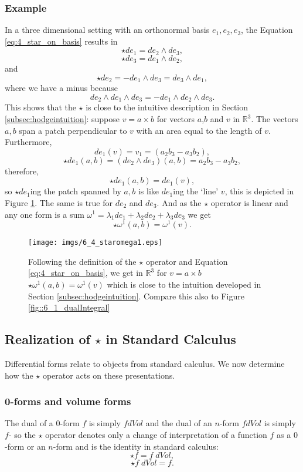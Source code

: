 \subsubsection{Example}
In a three dimensional setting with an orthonormal basis $e_1, e_2, e_3$, the Equation \ref{eq:4_star_on_basis} results in
\[\star de_1 =  de_2 \wedge de_3,\]
\[\star de_3 =  de_1 \wedge de_2,\]
and 
\[\star de_2 =  - de_1 \wedge de_3 =  de_3 \wedge de_1,\]
where we have a minus because
\[de_2 \wedge de_1 \wedge de_3 = - de_1 \wedge de_2 \wedge de_3.\]
This shows that the $\star$ is close to the intuitive description in Section \ref{subsec:hodgeintuition}:  suppose $v = a \times b$ for vectors $a$,$b$ and $v$ in $\mathbb R^3$. The vectors $a,b$ span a patch perpendicular to $v$ with an area equal to the length of $v$. Furthermore, 
\[de_1(v) = v_1 = (a_2b_3 -a_3b_2),\] 
\[\star de_1 (a,b)= (de_2 \wedge de_3)(a,b) = a_2b_3 -a_3b_2, \]
therefore,
\[\star de_1 (a,b) = de_1(v),\]
so $\star de_1$ing the patch spanned by $a,b$ is like $de_1$ing the `line' $v$, this is depicted in Figure \ref{fig:4_star_formal}. The same is true for $de_2$ and $de_3$. And as the $\star$ operator is linear and any one form is a sum $\omega^1 = \lambda_1de_1 + \lambda_2de_2 + \lambda_3de_3$ we get
\[\star\omega^1(a,b) = \omega^1(v).\]

\begin{figure}%
\begin{center}
\texttt{[image: imgs/6\_4\_staromega1.eps]}
\end{center}
\caption{Following the definition of the $\star$ operator and  Equation \ref{eq:4_star_on_basis}, we get in $\mathbb R^3$ for $v = a \times b$ $\star\omega^1(a,b) = \omega^1(v)$ which is close to the intuition developed in Section \ref{subsec:hodgeintuition}. Compare this also to Figure \ref{fig::6_1_dualIntegral}}
\label{fig:4_star_formal}%
\end{figure}


\subsection{Realization of $\star$ in Standard Calculus}
Differential forms relate to objects from standard calculus. We now determine how the $\star$ operator acts on these presentations.

\subsubsection{0-forms and volume forms}
The dual of a 0-form $f$ is simply $f dVol$ and the dual of an $n$-form $f dVol$ is simply $f$- so the $\star$ operator denotes only a change of interpretation of a function $f$ as a $0$-form or an $n$-form and is the identity in standard calculus:
\[\star f = f\; dVol,\]
\[\star f\;dVol = f.\]
